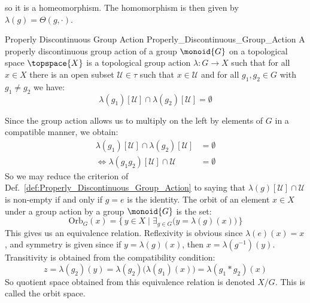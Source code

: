     so it is a homeomorphism. The homomorphism is then given by
    $\lambda(g)=\Theta(g,\cdot)$.
    \begin{fdefinition}{Properly Discontinuous Group Action}
                    {Properly_Discontinuous_Group_Action}
        A properly discontinuous group action of a group $\monoid{G}$ on a
        topological space $\topspace{X}$ is a topological group action
        $\lambda:G\rightarrow{X}$ such that for all $x\in{X}$ there is an open
        subset $\mathcal{U}\in\tau$ such that $x\in\mathcal{U}$ and
        for all $g_{1},g_{2}\in{G}$ with $g_{1}\ne{g}_{2}$ we have:
        \begin{equation*}
            \lambda(g_{1})[\mathcal{U}]\cap\lambda(g_{2})[\mathcal{U}]=\emptyset
        \end{equation*}
    \end{fdefinition}
    Since the group action allows us to multiply on the left by elements of $G$
    in a compatible manner, we obtain:
    \begin{subequations}
        \begin{align}
            \lambda(g_{1})[\mathcal{U}]\cap\lambda(g_{2})[\mathcal{U}]
                &=\emptyset\\
            \Leftrightarrow
            \lambda(g_{1}g_{2})[\mathcal{U}]\cap\mathcal{U}&=\emptyset
        \end{align}
    \end{subequations}
    So we may reduce the criterion of
    Def.~\ref{def:Properly_Discontinuous_Group_Action}
    to saying that $\lambda(g)[\mathcal{U}]\cap\mathcal{U}$ is non-empty if and
    only if $g=e$ is the identity. The orbit of an element $x\in{X}$ under a
    group action by a group $\monoid{G}$ is the set:
    \begin{equation}
        \textrm{Orb}_{G}(x)=\{\,y\in{X}\;|\;\exists_{g\in{G}}
            \big(y=\lambda(g)(x)\big)\,\}
    \end{equation}
    This gives us an equivalence relation. Reflexivity is obvious since
    $\lambda(e)(x)=x$, and symmetry is given since if
    $y=\lambda(g)(x)$, then $x=\lambda(g^{\minus{1}})(y)$. Transitivity is
    obtained from the compatibility condition:
    \begin{equation}
        z=\lambda(g_{2})(y)=\lambda(g_{2})\big(\lambda(g_{1})(x)\big)
            =\lambda(g_{1}*g_{2})(x)
    \end{equation}
    So quotient space obtained from this equivalence relation is denoted $X/G$.
    This is called the orbit space.
